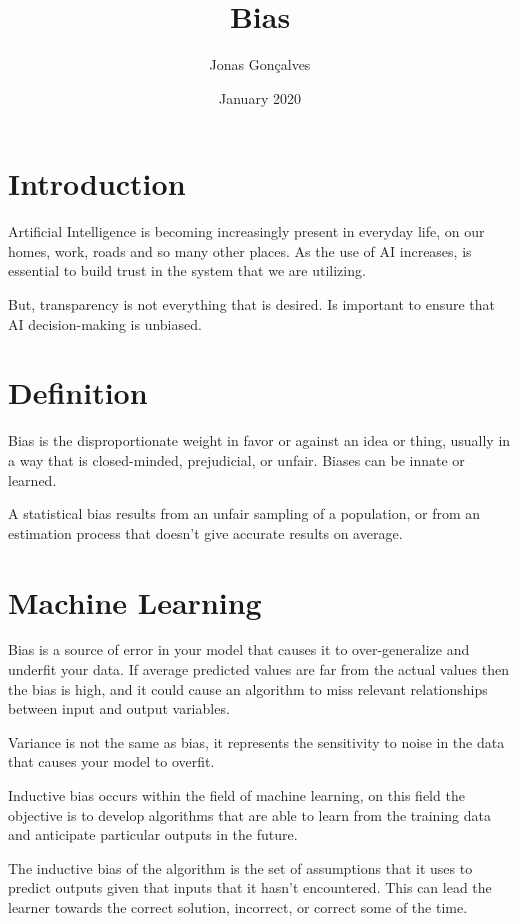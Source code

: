 \documentclass{article}
\title{Bias}
\author{Jonas Gonçalves}
\date{January 2020}
\begin{document}
\maketitle

\section{Introduction}

    Artificial Intelligence is becoming increasingly present in everyday life, on our homes, work, roads and so many other places. As the use of AI increases, is essential to build trust in the system that we are utilizing.
    
    But, transparency is not everything that is desired. Is important to ensure that AI decision-making is unbiased.

\section{Definition}

    Bias is the disproportionate weight in favor or against an idea or thing, usually in a way that is closed-minded, prejudicial, or unfair. Biases can be innate or learned.
    
    A statistical bias results from an unfair sampling of a population, or from an estimation process that doesn't give accurate results on average.
    
\section{Machine Learning}
    
    Bias is a source of error in your model that causes it to over-generalize and underfit your data. If average predicted values are far from the actual values then the bias is high,  and it could cause an algorithm to miss relevant relationships between input and output variables. 
    
    Variance is not the same as bias, it represents the sensitivity to noise in the data that causes your model to overfit.
    
    Inductive bias occurs within the field of machine learning, on this field the objective is to develop algorithms that are able to learn from the training data and anticipate particular outputs in the future.
    
    The inductive bias of the algorithm is the set of assumptions that it uses to predict outputs given that inputs that it hasn't encountered. This can lead the learner towards the correct solution, incorrect, or correct some of the time.
    
\end{document}
